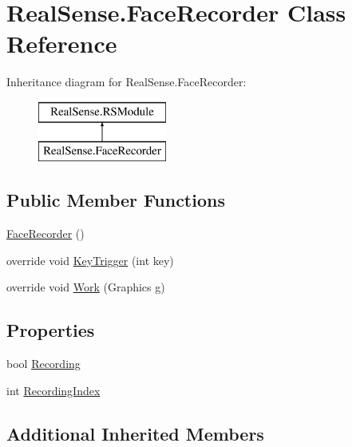 \hypertarget{class_real_sense_1_1_face_recorder}{}\section{Real\+Sense.\+Face\+Recorder Class Reference}
\label{class_real_sense_1_1_face_recorder}
Inheritance diagram for Real\+Sense.\+Face\+Recorder\+:\begin{figure}[H]
\begin{center}
\leavevmode
\includegraphics[height=2.000000cm]{class_real_sense_1_1_face_recorder}
\end{center}
\end{figure}
\subsection*{Public Member Functions}
\begin{DoxyCompactItemize}
\item 
\hyperlink{class_real_sense_1_1_face_recorder_a782589b2a536a93d548f1efab49c6bcd}{Face\+Recorder} ()
\item 
override void \hyperlink{class_real_sense_1_1_face_recorder_a315985241eb6c21f6393d8104a967eb6}{Key\+Trigger} (int key)
\item 
override void \hyperlink{class_real_sense_1_1_face_recorder_a2adae8c9db76fe9617e99795b4fa5e0e}{Work} (Graphics g)
\end{DoxyCompactItemize}
\subsection*{Properties}
\begin{DoxyCompactItemize}
\item 
bool \hyperlink{class_real_sense_1_1_face_recorder_a3dd841901321c20b2bba9067fc67bddd}{Recording}
\item 
int \hyperlink{class_real_sense_1_1_face_recorder_a4f1a094d0321d299feb5aa0e3553b506}{Recording\+Index}
\end{DoxyCompactItemize}
\subsection*{Additional Inherited Members}


